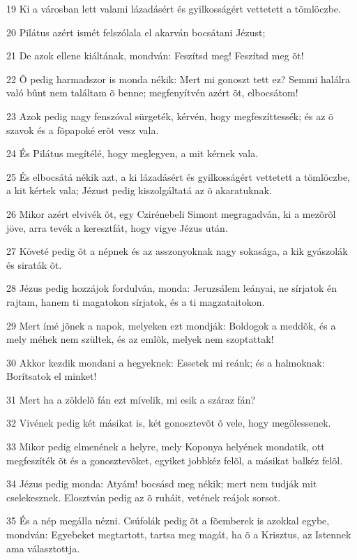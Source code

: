 \par 19 Ki a városban lett valami lázadásért és gyilkosságért vettetett a tömlöczbe.
\par 20 Pilátus azért ismét felszólala el akarván bocsátani Jézust;
\par 21 De azok ellene kiáltának, mondván: Feszítsd meg! Feszítsd meg õt!
\par 22 Õ pedig harmadszor is monda nékik: Mert mi gonoszt tett ez? Semmi halálra való bûnt nem találtam õ benne; megfenyítvén azért õt, elbocsátom!
\par 23 Azok pedig nagy fenszóval sürgeték, kérvén, hogy megfeszíttessék; és az õ szavok és a fõpapoké erõt vesz vala.
\par 24 És Pilátus megítélé, hogy meglegyen, a mit kérnek vala.
\par 25 És elbocsátá nékik azt, a ki lázadásért és gyilkosságért vettetett a tömlöczbe, a kit kértek vala; Jézust pedig kiszolgáltatá az õ akaratuknak.
\par 26 Mikor azért elvivék õt, egy Czirénebeli Simont megragadván, ki a mezõrõl jöve, arra tevék a keresztfát, hogy vigye Jézus után.
\par 27 Követé pedig õt a népnek és az asszonyoknak nagy sokasága, a kik gyászolák és siraták õt.
\par 28 Jézus pedig hozzájok fordulván, monda: Jeruzsálem leányai, ne sírjatok én rajtam, hanem ti magatokon sírjatok, és a ti magzataitokon.
\par 29 Mert ímé jõnek a napok, melyeken ezt mondják: Boldogok a meddõk, és a mely méhek nem szültek, és az emlõk, melyek nem szoptattak!
\par 30 Akkor kezdik mondani a hegyeknek: Essetek mi reánk; és a halmoknak: Borítsatok el minket!
\par 31 Mert ha a zöldelõ fán ezt mívelik, mi esik a száraz fán?
\par 32 Vivének pedig két másikat is, két gonosztevõt õ vele, hogy megölessenek.
\par 33 Mikor pedig elmenének a helyre, mely Koponya helyének mondatik, ott megfeszíték õt és a gonosztevõket, egyiket jobbkéz  felõl, a másikat balkéz felõl.
\par 34 Jézus pedig monda: Atyám! bocsásd meg nékik; mert nem tudják mit cselekesznek. Elosztván pedig az õ ruháit, vetének  reájok sorsot.
\par 35 És a nép megálla nézni. Csúfolák pedig õt a fõemberek is azokkal egybe, mondván: Egyebeket megtartott, tartsa meg magát, ha õ a Krisztus, az Istennek ama választottja.

